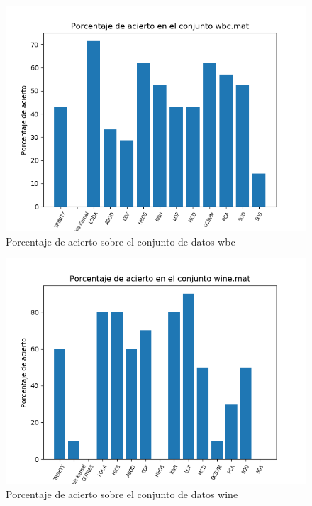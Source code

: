 \begin{figure}[H]
	\centering
	\includegraphics[scale=0.7]{imagenes/imgs-exp1/accuracy/wbc}
	\caption{Porcentaje de acierto sobre el conjunto de datos wbc}
	\label{wbc_accuracy}
\end{figure}

\begin{figure}[H]
	\centering
	\includegraphics[scale=0.7]{imagenes/imgs-exp1/accuracy/wine}
	\caption{Porcentaje de acierto sobre el conjunto de datos wine}
	\label{wine_accuracy}
\end{figure}

